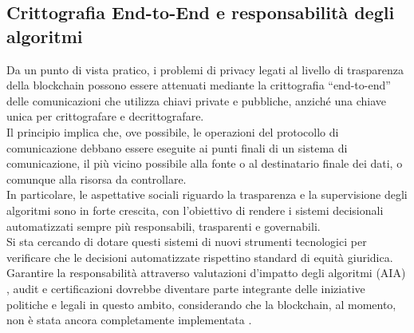\subsection{Crittografia End-to-End e responsabilità degli algoritmi}
Da un punto di vista pratico, i problemi di privacy legati al livello di trasparenza della blockchain possono essere attenuati mediante la crittografia “end-to-end” delle comunicazioni che utilizza chiavi private e pubbliche, anziché una chiave unica per crittografare e decrittografare.
\\Il principio implica che, ove possibile, le operazioni del protocollo di comunicazione debbano essere eseguite ai punti finali di un sistema di comunicazione, il più vicino possibile alla fonte o al destinatario finale dei dati, o comunque alla risorsa da controllare.
\\In particolare, le aspettative sociali riguardo la trasparenza e la supervisione degli algoritmi sono in forte crescita, con l’obiettivo di rendere i sistemi decisionali automatizzati sempre più responsabili, trasparenti e governabili. 
\\Si sta cercando di dotare questi sistemi di nuovi strumenti tecnologici per verificare che le decisioni automatizzate rispettino standard di equità giuridica. 
\\Garantire la responsabilità attraverso valutazioni d’impatto degli algoritmi (AIA) \cite{reisman_algorithmic_2018}, audit e certificazioni dovrebbe diventare parte integrante delle iniziative politiche e legali in questo ambito, considerando che la blockchain, al momento, non è stata ancora completamente implementata \cite{zhang_end_to_end_3}.

